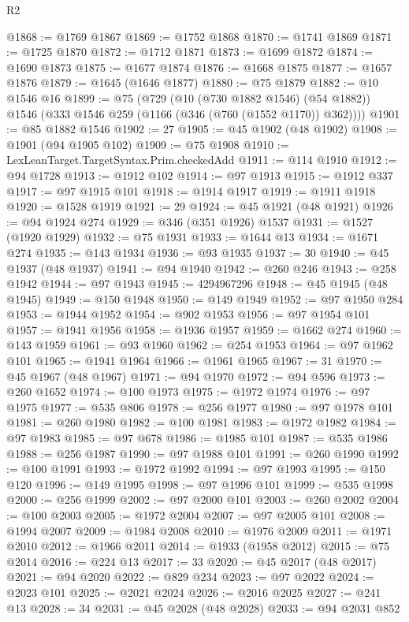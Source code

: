 \begin{lexlean}{R2}
\begin{coremodule}
@1868 := @1769 @1867
@1869 := @1752 @1868
@1870 := @1741 @1869
@1871 := @1725 @1870
@1872 := @1712 @1871
@1873 := @1699 @1872
@1874 := @1690 @1873
@1875 := @1677 @1874
@1876 := @1668 @1875
@1877 := @1657 @1876
@1879 := @1645 (@1646 @1877)
@1880 := @75 @1879
@1882 := @10 @1546 @16
@1899 := @75
    (@729
      (@10 (@730 @1882 @1546) (@54 @1882))
      @1546
      (@333 @1546 @259 (@1166 (@346 (@760 (@1552 @1170)) @362))))
@1901 := @85 @1882 @1546
@1902 := 27
@1905 := @45 @1902 (@48 @1902)
@1908 := @1901 (@94 @1905 @102)
@1909 := @75 @1908
@1910 := LexLeanTarget.TargetSyntax.Prim.checkedAdd
@1911 := @114 @1910
@1912 := @94 @1728
@1913 := @1912 @102
@1914 := @97 @1913
@1915 := @1912 @337
@1917 := @97 @1915 @101
@1918 := @1914 @1917
@1919 := @1911 @1918
@1920 := @1528 @1919
@1921 := 29
@1924 := @45 @1921 (@48 @1921)
@1926 := @94 @1924 @274
@1929 := @346 (@351 @1926) @1537
@1931 := @1527 (@1920 @1929)
@1932 := @75 @1931
@1933 := @1644 @13
@1934 := @1671 @274
@1935 := @143 @1934
@1936 := @93 @1935
@1937 := 30
@1940 := @45 @1937 (@48 @1937)
@1941 := @94 @1940
@1942 := @260 @246
@1943 := @258 @1942
@1944 := @97 @1943
@1945 := 4294967296
@1948 := @45 @1945 (@48 @1945)
@1949 := @150 @1948
@1950 := @149 @1949
@1952 := @97 @1950 @284
@1953 := @1944 @1952
@1954 := @902 @1953
@1956 := @97 @1954 @101
@1957 := @1941 @1956
@1958 := @1936 @1957
@1959 := @1662 @274
@1960 := @143 @1959
@1961 := @93 @1960
@1962 := @254 @1953
@1964 := @97 @1962 @101
@1965 := @1941 @1964
@1966 := @1961 @1965
@1967 := 31
@1970 := @45 @1967 (@48 @1967)
@1971 := @94 @1970
@1972 := @94 @596
@1973 := @260 @1652
@1974 := @100 @1973
@1975 := @1972 @1974
@1976 := @97 @1975
@1977 := @535 @806
@1978 := @256 @1977
@1980 := @97 @1978 @101
@1981 := @260 @1980
@1982 := @100 @1981
@1983 := @1972 @1982
@1984 := @97 @1983
@1985 := @97 @678
@1986 := @1985 @101
@1987 := @535 @1986
@1988 := @256 @1987
@1990 := @97 @1988 @101
@1991 := @260 @1990
@1992 := @100 @1991
@1993 := @1972 @1992
@1994 := @97 @1993
@1995 := @150 @120
@1996 := @149 @1995
@1998 := @97 @1996 @101
@1999 := @535 @1998
@2000 := @256 @1999
@2002 := @97 @2000 @101
@2003 := @260 @2002
@2004 := @100 @2003
@2005 := @1972 @2004
@2007 := @97 @2005 @101
@2008 := @1994 @2007
@2009 := @1984 @2008
@2010 := @1976 @2009
@2011 := @1971 @2010
@2012 := @1966 @2011
@2014 := @1933 (@1958 @2012)
@2015 := @75 @2014
@2016 := @224 @13
@2017 := 33
@2020 := @45 @2017 (@48 @2017)
@2021 := @94 @2020
@2022 := @829 @234
@2023 := @97 @2022
@2024 := @2023 @101
@2025 := @2021 @2024
@2026 := @2016 @2025
@2027 := @241 @13
@2028 := 34
@2031 := @45 @2028 (@48 @2028)
@2033 := @94 @2031 @852

\end{coremodule}
\end{lexlean}
